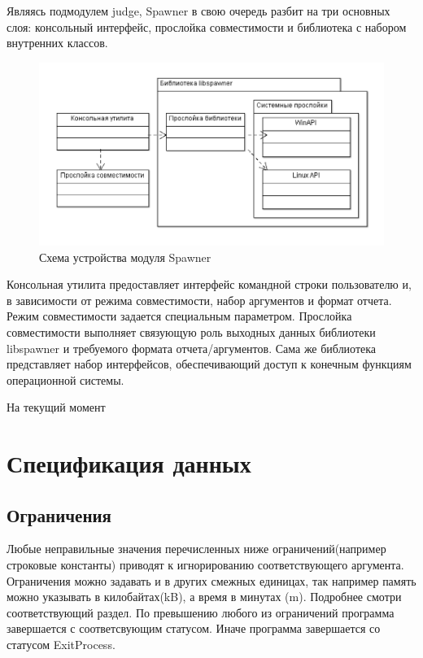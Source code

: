 \documentclass{imcs}
\begin{document}
\FloatBarrier 
Являясь подмодулем judge, Spawner в свою очередь разбит на три основных слоя: консольный интерфейс, прослойка совместимости и библиотека с набором внутренних классов.
\begin{figure}[htb]
\centering
\includegraphics{./img/sp.png}
\caption{Схема устройства модуля Spawner}
\label{spawnermodule}
\end{figure}
\FloatBarrier
Консольная утилита предоставляет интерфейс командной строки пользователю и, в зависимости от режима совместимости, набор аргументов и формат отчета.
Режим совместимости задается специальным параметром.
Прослойка совместимости выполняет связующую роль выходных данных библиотеки libspawner и требуемого формата отчета/аргументов.
Сама же библиотека представляет набор интерфейсов, обеспечивающий доступ к конечным функциям операционной системы.

На текущий момент

\section{Спецификация данных}
\subsection{Ограничения}
Любые неправильные значения перечисленных ниже ограничений(например строковые константы) приводят к игнорированию соответствующего аргумента.
Ограничения можно задавать и в других смежных единицах, так например память можно указывать в килобайтах(kB), а время в минутах (m). Подробнее смотри соответствующий раздел.
По превышению любого из ограничений программа завершается с соответсвующим статусом. Иначе программа завершается со статусом ExitProcess.
\end{document}

